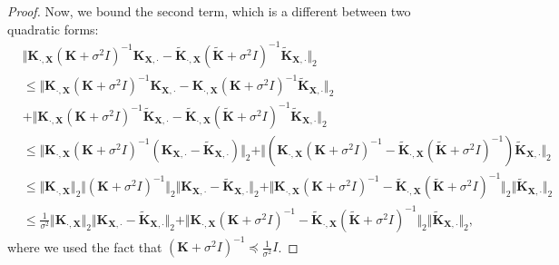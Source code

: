\begin{proof}
Now, we bound the second term, which is a different between two quadratic forms:
\begin{align*}
    &\Vert \textbf{K}_{\cdot,\textbf{X}} (\textbf{K}+\sigma^2 I)^{-1}\textbf{K}_{\textbf{X},\cdot}-\tilde{\textbf{K}}_{\cdot,\textbf{X}} (\tilde{\textbf{K}}+\sigma^2 I)^{-1}\tilde{\textbf{K}}_{\textbf{X},\cdot}\Vert_2\\
    &\leq \Vert \textbf{K}_{\cdot,\textbf{X}} (\textbf{K}+\sigma^2 I)^{-1}\textbf{K}_{\textbf{X},\cdot}-\textbf{K}_{\cdot,\textbf{X}} (\textbf{K}+\sigma^2 I)^{-1}\tilde{\textbf{K}}_{\textbf{X},\cdot}\Vert_2 \\
    &+ \Vert\textbf{K}_{\cdot,\textbf{X}} (\textbf{K}+\sigma^2 I)^{-1}\tilde{\textbf{K}}_{\textbf{X},\cdot}-\tilde{\textbf{K}}_{\cdot,\textbf{X}} (\tilde{\textbf{K}}+\sigma^2 I)^{-1}\tilde{\textbf{K}}_{\textbf{X},\cdot}\Vert_2\\
    &\leq \Vert \textbf{K}_{\cdot,\textbf{X}} (\textbf{K}+\sigma^2 I)^{-1}(\textbf{K}_{\textbf{X},\cdot}-\tilde{\textbf{K}}_{\textbf{X},\cdot})\Vert_2 + \Vert (\textbf{K}_{\cdot,\textbf{X}} (\textbf{K}+\sigma^2 I)^{-1}-\tilde{\textbf{K}}_{\cdot,\textbf{X}} (\tilde{\textbf{K}}+\sigma^2 I)^{-1})\tilde{\textbf{K}}_{\textbf{X},\cdot}\Vert_2\\
    &\leq \Vert \textbf{K}_{\cdot,\textbf{X}} \Vert_2 \Vert (\textbf{K}+\sigma^2 I)^{-1} \Vert_2 \Vert \textbf{K}_{\textbf{X},\cdot}-\tilde{\textbf{K}}_{\textbf{X},\cdot} \Vert_2 + \Vert \textbf{K}_{\cdot,\textbf{X}} (\textbf{K}+\sigma^2 I)^{-1}-\tilde{\textbf{K}}_{\cdot,\textbf{X}} (\tilde{\textbf{K}}+\sigma^2 I)^{-1} \Vert_2 \Vert \tilde{\textbf{K}}_{\textbf{X},\cdot} \Vert_2\\
    &\leq \frac{1}{\sigma^2} \Vert \textbf{K}_{\cdot,\textbf{X}}\Vert_2 \Vert \textbf{K}_{\textbf{X},\cdot}-\tilde{\textbf{K}}_{\textbf{X},\cdot}\Vert_2 + \Vert \textbf{K}_{\cdot,\textbf{X}} (\textbf{K}+\sigma^2 I)^{-1}-\tilde{\textbf{K}}_{\cdot,\textbf{X}} (\tilde{\textbf{K}}+\sigma^2 I)^{-1} \Vert_2 \Vert \tilde{\textbf{K}}_{\textbf{X},\cdot} \Vert_2,
\end{align*}
where we used the fact that $(\textbf{K}+\sigma^2 I)^{-1} \preceq \frac{1}{\sigma^2}I$.


\end{proof}
